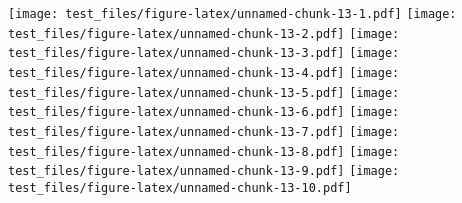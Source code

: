 \documentclass[]{article}
\newenvironment{Shaded}{\begin{snugshade}}{\end{snugshade}}
\newcommand{\KeywordTok}[1]{\textcolor[rgb]{0.13,0.29,0.53}{\textbf{{#1}}}}
\newcommand{\DataTypeTok}[1]{\textcolor[rgb]{0.13,0.29,0.53}{{#1}}}
\newcommand{\DecValTok}[1]{\textcolor[rgb]{0.00,0.00,0.81}{{#1}}}
\newcommand{\StringTok}[1]{\textcolor[rgb]{0.31,0.60,0.02}{{#1}}}
\newcommand{\NormalTok}[1]{{#1}}
\begin{document}
\begin{Shaded}
\end{Shaded}

\texttt{[image: test\_files/figure-latex/unnamed-chunk-13-1.pdf]}
\texttt{[image: test\_files/figure-latex/unnamed-chunk-13-2.pdf]}
\texttt{[image: test\_files/figure-latex/unnamed-chunk-13-3.pdf]}
\texttt{[image: test\_files/figure-latex/unnamed-chunk-13-4.pdf]}
\texttt{[image: test\_files/figure-latex/unnamed-chunk-13-5.pdf]}
\texttt{[image: test\_files/figure-latex/unnamed-chunk-13-6.pdf]}
\texttt{[image: test\_files/figure-latex/unnamed-chunk-13-7.pdf]}
\texttt{[image: test\_files/figure-latex/unnamed-chunk-13-8.pdf]}
\texttt{[image: test\_files/figure-latex/unnamed-chunk-13-9.pdf]}
\texttt{[image: test\_files/figure-latex/unnamed-chunk-13-10.pdf]}
\end{document}
